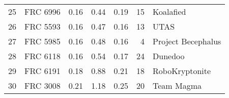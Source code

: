 \begin{center}
\begin{tabular}{ |r|l|r|r|r|r|l| }
\hline
 25 &  FRC 6996 & 0.16 & 0.44 & 0.19  & 15 & Koalafied \\
 26 &  FRC 5593 & 0.16 & 0.47 & 0.16  & 13 & UTAS \\
 27 &  FRC 5985 & 0.16 & 0.48 & 0.16  & 4 & Project Becephalus \\
 28 &  FRC 6118 & 0.16 & 0.54 & 0.17  & 24 & Dunedoo \\
 29 &  FRC 6191 & 0.18 & 0.88 & 0.21  & 18 & RoboKryptonite \\
 30 &  FRC 3008 & 0.21 & 1.18 & 0.25  & 20 & Team Magma \\
\hline
\end{tabular}
\end{center}































